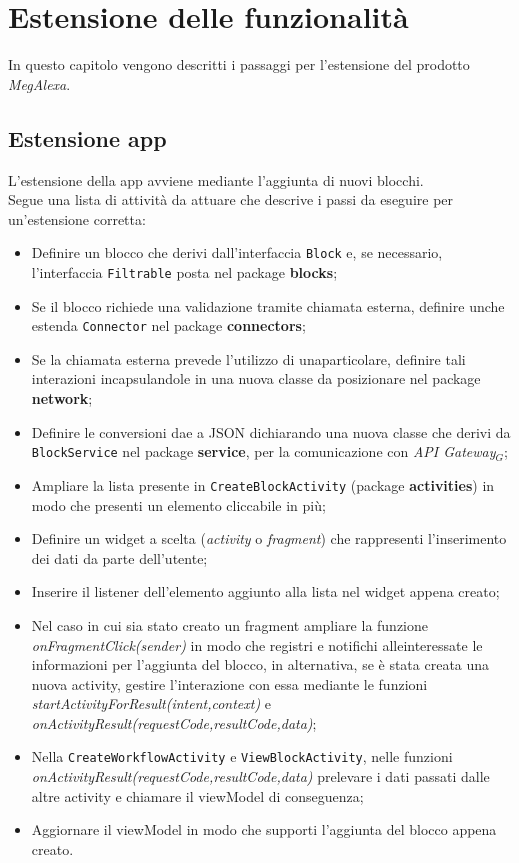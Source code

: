 \chapter{Estensione delle funzionalità}\label{estensione}
In questo capitolo vengono descritti i passaggi per l'estensione del prodotto \textit{MegAlexa}.

\section{Estensione app}
L'estensione della app avviene mediante l'aggiunta di nuovi blocchi.\\
Segue una lista di attività da attuare che descrive i passi da eseguire per un'estensione corretta:

\begin{itemize}
	\item Definire un blocco che derivi dall'interfaccia \texttt{Block} e, se necessario, l'interfaccia \texttt{Filtrable} posta nel package \textbf{blocks};
	\item Se il blocco richiede una validazione tramite chiamata esterna, definire unche estenda \texttt{Connector} nel package \textbf{connectors};
	\item Se la chiamata esterna prevede l'utilizzo di unaparticolare, definire tali interazioni incapsulandole in una nuova classe da posizionare nel package \textbf{network};
	\item Definire le conversioni dae a JSON dichiarando una nuova classe che derivi da \texttt{BlockService} nel package \textbf{service}, per la comunicazione con \textit{API Gateway$_{G}$};
	\item Ampliare la lista presente in \texttt{CreateBlockActivity} (package \textbf{activities}) in modo che presenti un elemento cliccabile in più;
	\item Definire un widget a scelta (\textit{activity} o \textit{fragment}) che rappresenti l'inserimento dei dati da parte dell'utente;
	\item Inserire il listener dell'elemento aggiunto alla lista nel widget appena creato;
	\item Nel caso in cui sia stato creato un fragment ampliare la funzione \textit{onFragmentClick(sender)} in modo che registri e notifichi alleinteressate le informazioni per l'aggiunta del blocco, in alternativa, se è stata creata una nuova activity, gestire l'interazione con essa mediante le funzioni \textit{startActivityForResult(intent,context)} e \textit{onActivityResult(requestCode,resultCode,data)};
	\item Nella \texttt{CreateWorkflowActivity} e \texttt{ViewBlockActivity}, nelle funzioni \textit{onActivityResult(requestCode,resultCode,data)} 	prelevare i dati passati dalle altre activity e chiamare il viewModel di conseguenza;
	\item Aggiornare il viewModel in modo che supporti l'aggiunta del blocco appena creato.
\end{itemize}



